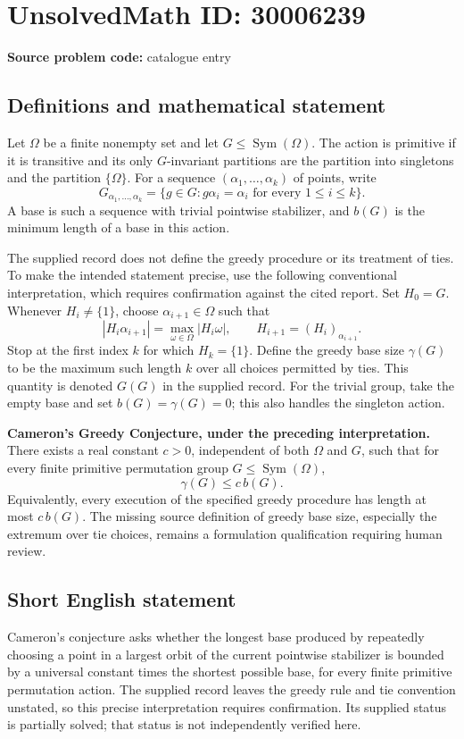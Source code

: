 \documentclass[11pt]{article}
\begin{document}
\section*{UnsolvedMath ID: 30006239}
\textbf{Source problem code:} catalogue entry
\subsection{Definitions and mathematical statement}
Let \(\Omega\) be a finite nonempty set and let \(G\leq\operatorname{Sym}(\Omega)\). The action is primitive if it is transitive and its only \(G\)-invariant partitions are the partition into singletons and the partition \(\{\Omega\}\). For a sequence \((\alpha_1,\ldots,\alpha_k)\) of points, write
\[
G_{\alpha_1,\ldots,\alpha_k}=\{g\in G:g\alpha_i=\alpha_i\text{ for every }1\leq i\leq k\}.
\]
A base is such a sequence with trivial pointwise stabilizer, and \(b(G)\) is the minimum length of a base in this action.

The supplied record does not define the greedy procedure or its treatment of ties. To make the intended statement precise, use the following conventional interpretation, which requires confirmation against the cited report. Set \(H_0=G\). Whenever \(H_i\neq\{1\}\), choose \(\alpha_{i+1}\in\Omega\) such that
\[
|H_i\alpha_{i+1}|=\max_{\omega\in\Omega}|H_i\omega|,
\qquad H_{i+1}=(H_i)_{\alpha_{i+1}}.
\]
Stop at the first index \(k\) for which \(H_k=\{1\}\). Define the greedy base size \(\gamma(G)\) to be the maximum such length \(k\) over all choices permitted by ties. This quantity is denoted \(G(G)\) in the supplied record. For the trivial group, take the empty base and set \(b(G)=\gamma(G)=0\); this also handles the singleton action.

\textbf{Cameron's Greedy Conjecture, under the preceding interpretation.} There exists a real constant \(c>0\), independent of both \(\Omega\) and \(G\), such that for every finite primitive permutation group \(G\leq\operatorname{Sym}(\Omega)\),
\[
\gamma(G)\leq c\,b(G).
\]
Equivalently, every execution of the specified greedy procedure has length at most \(c\,b(G)\). The missing source definition of greedy base size, especially the extremum over tie choices, remains a formulation qualification requiring human review.
\subsection{Short English statement}
Cameron's conjecture asks whether the longest base produced by repeatedly choosing a point in a largest orbit of the current pointwise stabilizer is bounded by a universal constant times the shortest possible base, for every finite primitive permutation action. The supplied record leaves the greedy rule and tie convention unstated, so this precise interpretation requires confirmation. Its supplied status is partially solved; that status is not independently verified here.
\end{document}

